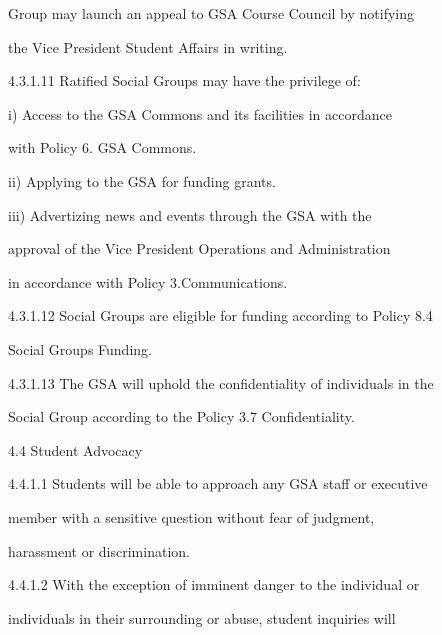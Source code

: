               Group may launch an appeal to GSA Course Council by notifying  

              the Vice President Student Affairs in writing.   



4.3.1.11      Ratified Social Groups may have the privilege of:   



         i)      Access  to  the  GSA  Commons  and  its  facilities  in  accordance  

                 with Policy 6. GSA Commons.   



         ii)     Applying to the GSA for funding grants.  



         iii)    Advertizing news and events through the GSA with the  

                 approval of the Vice President Operations and Administration  

                 in accordance with Policy 3.Communications.   



4.3.1.12      Social  Groups  are  eligible  for  funding  according  to  Policy  8.4  

              Social Groups Funding.   



4.3.1.13      The  GSA  will  uphold  the  confidentiality  of  individuals  in  the  

              Social Group according to the Policy 3.7 Confidentiality.   



  



                              4.4      Student Advocacy   



4.4.1.1       Students  will  be  able  to  approach  any  GSA  staff  or  executive  

              member  with  a  sensitive  question  without  fear  of  judgment,  

              harassment or discrimination.   



4.4.1.2       With  the  exception  of  imminent  danger  to  the  individual  or  

              individuals  in  their  surrounding  or  abuse,  student  inquiries  will  

